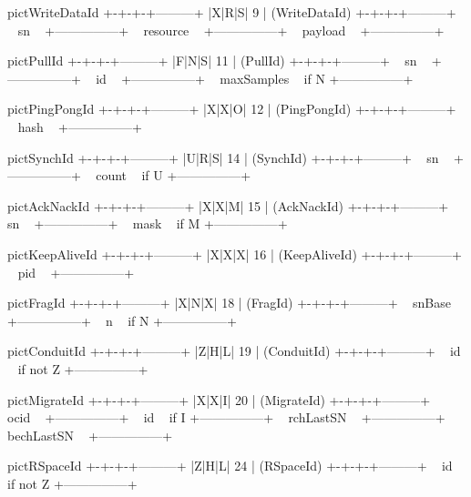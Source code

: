 \begin{SaveVerbatim}{pictWriteDataId}
+-+-+-+---------+
|X|R|S|    9    | (WriteDataId)
+-+-+-+---------+
~      sn       ~
+---------------+
~   resource    ~
+---------------+
~    payload    ~
+---------------+
\end{SaveVerbatim}
\begin{SaveVerbatim}{pictPullId}
+-+-+-+---------+
|F|N|S|   11    | (PullId)
+-+-+-+---------+
~      sn       ~
+---------------+
~      id       ~
+---------------+
~  maxSamples   ~ if N
+---------------+
\end{SaveVerbatim}
\begin{SaveVerbatim}{pictPingPongId}
+-+-+-+---------+
|X|X|O|   12    | (PingPongId)
+-+-+-+---------+
~     hash      ~
+---------------+
\end{SaveVerbatim}
\begin{SaveVerbatim}{pictSynchId}
+-+-+-+---------+
|U|R|S|   14    | (SynchId)
+-+-+-+---------+
~      sn       ~
+---------------+
~     count     ~ if U
+---------------+
\end{SaveVerbatim}
\begin{SaveVerbatim}{pictAckNackId}
+-+-+-+---------+
|X|X|M|   15    | (AckNackId)
+-+-+-+---------+
~      sn       ~
+---------------+
~     mask      ~ if M
+---------------+
\end{SaveVerbatim}
\begin{SaveVerbatim}{pictKeepAliveId}
+-+-+-+---------+
|X|X|X|   16    | (KeepAliveId)
+-+-+-+---------+
~      pid      ~
+---------------+
\end{SaveVerbatim}
\begin{SaveVerbatim}{pictFragId}
+-+-+-+---------+
|X|N|X|   18    | (FragId)
+-+-+-+---------+
~    snBase     ~
+---------------+
~       n       ~ if N
+---------------+
\end{SaveVerbatim}
\begin{SaveVerbatim}{pictConduitId}
+-+-+-+---------+
|Z|H|L|   19    | (ConduitId)
+-+-+-+---------+
~      id       ~ if not Z
+---------------+
\end{SaveVerbatim}
\begin{SaveVerbatim}{pictMigrateId}
+-+-+-+---------+
|X|X|I|   20    | (MigrateId)
+-+-+-+---------+
~     ocid      ~
+---------------+
~      id       ~ if I
+---------------+
~   rchLastSN   ~
+---------------+
~  bechLastSN   ~
+---------------+
\end{SaveVerbatim}
\begin{SaveVerbatim}{pictRSpaceId}
+-+-+-+---------+
|Z|H|L|   24    | (RSpaceId)
+-+-+-+---------+
~      id       ~ if not Z
+---------------+
\end{SaveVerbatim}
